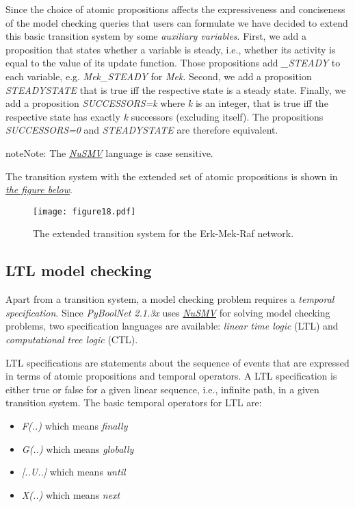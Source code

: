 \documentclass[letterpaper,10pt,english]{sphinxmanual}
\begin{document}
Since the choice of atomic propositions affects the expressiveness and conciseness of the model checking queries that users can formulate
we have decided to extend this basic transition system by some \emph{auxiliary variables}.
First, we add a proposition that states whether a variable is steady, i.e., whether its activity is equal to the value of its update function.
Those propositions add \emph{\_STEADY} to each variable, e.g. \emph{Mek\_STEADY} for \emph{Mek}.
Second, we add a proposition \emph{STEADYSTATE} that is true iff the respective state is a steady state.
Finally, we add a proposition \emph{SUCCESSORS=k} where \emph{k} is an integer,
that is true iff the respective state has exactly \emph{k} successors (excluding itself).
The propositions \emph{SUCCESSORS=0} and \emph{STEADYSTATE} are therefore equivalent.

\begin{notice}{note}{Note:}
The {\hyperref[Installation:installation-nusmv]{\emph{NuSMV}}} language is case sensitive.
\end{notice}

The transition system with the extended set of atomic propositions is shown in {\hyperref[Manual:figure18]{\emph{the figure below}}}.
\begin{figure}[htbp]
\centering
\capstart

\texttt{[image: figure18.pdf]}
\caption{The extended transition system for the Erk-Mek-Raf network.}\label{Manual:figure18}\end{figure}


\subsection{LTL model checking}
\label{Manual:ltl-model-checking}
Apart from a transition system, a model checking problem requires a \emph{temporal specification}.
Since \emph{PyBoolNet 2.1.3x} uses {\hyperref[Installation:installation-nusmv]{\emph{NuSMV}}} for solving model checking problems, two specification languages are available:
\emph{linear time logic} (LTL) and \emph{computational tree logic} (CTL).

LTL specifications are statements about the sequence of events that are expressed in terms of atomic propositions and temporal operators.
A LTL specification is either true or false for a given linear sequence, i.e., infinite path, in a given transition system.
The basic temporal operators for LTL are:
\begin{itemize}
\item {} 
\emph{F(..)} which means \emph{finally}

\item {} 
\emph{G(..)} which means \emph{globally}

\item {} 
\emph{{[}..U..{]}} which means \emph{until}

\item {} 
\emph{X(..)} which means \emph{next}

\end{itemize}
\end{document}
